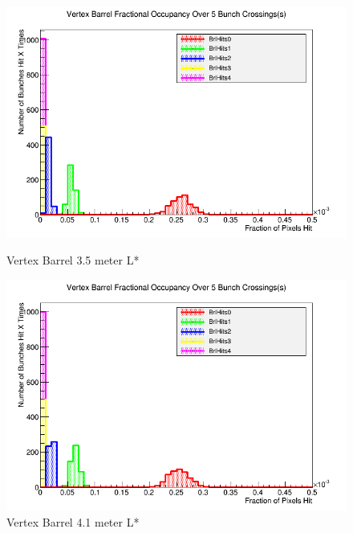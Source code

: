 \documentclass{report}
\begin{document}
                \begin{figure}[H]
                    \centering
                    \begin{minipage}{0.4\textwidth}
                        \includegraphics[width=\textwidth]{Voccupancy_sidloi3_IR_realign_preqd0shift_5B_ps30_1510212229_brl}
                        \caption{Vertex Barrel 3.5 meter L*}
                        \label{fig__lstar_vertex_brl_3.5}
                    \end{minipage}
                    \begin{minipage}{0.4\textwidth}
                        \includegraphics[width=\textwidth]{Voccupancy_sidloi3_IR_realign_5B_ps30_1510211229_brl}
                        \caption{Vertex Barrel 4.1 meter L*}
                        \label{fig__lstar_vertex_brl_4.1}
                    \end{minipage}
                \end{figure}
\end{document}
